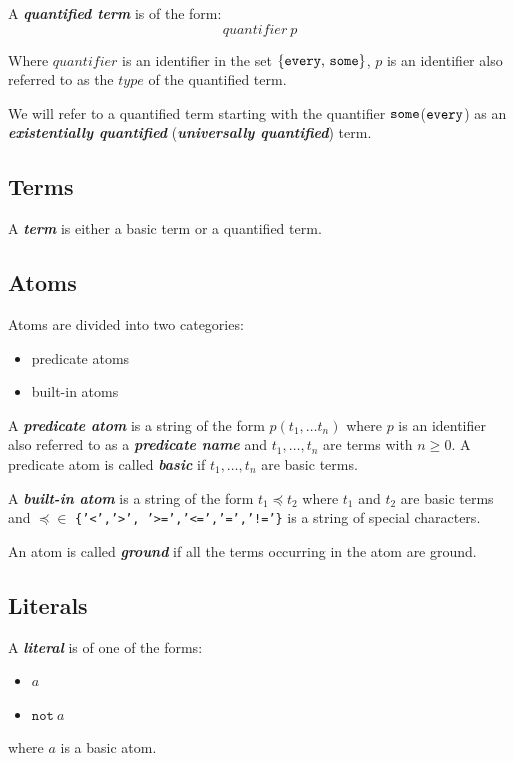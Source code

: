 \documentclass[a4paper,10pt]{article}
\begin{document}
A \textit{\textbf{quantified term}} is of the form:
 $$ quantifier~p $$



Where $quantifier$ is an identifier in the set $\{\mbox{\texttt{every}, \texttt{some}}\}$, $p$ is an identifier also referred to as the $type$ of the quantified term.

We will refer to a quantified term starting with the quantifier $\mbox{\texttt{some}}$($\mbox{\texttt{every}}$) as an \textbf{\textit{existentially quantified}} (\textbf{\textit{universally quantified}}) term.  


\subsection{Terms}
A \textit{\textbf{term}} is either a basic term or a quantified term.
\subsection{Atoms}

Atoms are divided into two categories:
\begin{itemize}
\item predicate atoms
\item built-in atoms
\end{itemize}

A \textit{\textbf{predicate atom}} is a string of the form $p(t_1,\ldots t_n)$ where 
$p$ is an identifier also referred to as a \textbf{\textit{predicate name}} and $t_1,\ldots,t_n$ are terms with $n \geq 0$.
A predicate atom is called \textbf{\textit{basic}} if $t_1,\ldots,t_n$ are basic terms.

A \textit{\textbf{built-in atom}} is a string of the form $t_1 \preceq t_2$ where $t_1$ and $t_2$ are basic terms and $\preceq \in$ \texttt{\{'<','>', '>=','<=','=','!='\}} is a string of special characters.

An atom is called \textbf{\textit{ground}} if all the terms occurring in the atom are ground.

\subsection{Literals}

A \textit{\textbf{literal}} is of one of the forms:

\begin{itemize}
\item $a$
\item $\texttt{not}~a$
\end{itemize}
where $a$ is a basic atom.
\end{document}
